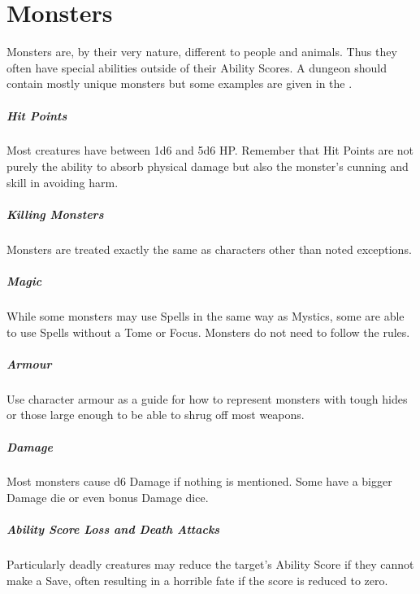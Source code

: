 \documentclass[itdr/core]{subfiles}
\begin{document}
\cleartoleftpage

\chapter{Monsters}
\label{ch:monsters}

Monsters are, by their very nature, different to people and animals. Thus they often have special abilities outside of their Ability Scores. A dungeon should contain mostly unique monsters but some examples are given in the \textbf{}.

\vfill
{}
\paragraph{Hit Points}
Most creatures have between 1d6 and 5d6 HP. Remember that Hit Points are not purely the ability to absorb physical damage but also the monster's cunning and skill in avoiding harm.

\vfill
\paragraph{Killing Monsters}
Monsters are treated exactly the same as characters other than noted exceptions.

\vfill
{}
\paragraph{Magic}
While some monsters may use Spells in the same way as Mystics, some are able to use Spells without a Tome or Focus. Monsters do not need to follow the rules.

\vfill
{}
\paragraph{Armour}
Use character armour as a guide for how to represent monsters with tough hides or those large enough to be able to shrug off most weapons.

\vfill
{}
\paragraph{Damage}
Most monsters cause d6 Damage if nothing is mentioned. Some have a bigger Damage die or even bonus Damage dice.

\vfill
{}
\paragraph{Ability Score Loss and Death Attacks}
Particularly deadly creatures may reduce the target's Ability Score if they cannot make a Save, often resulting in a horrible fate if the score is reduced to zero.
\end{document}
